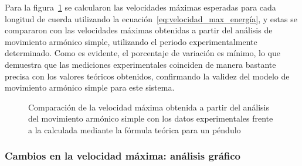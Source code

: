 \documentclass[letterpaper]{report}
\numberwithin{table}{section}
\begin{document}
Para la figura~\ref{fig:velocidad_máxima_mas_energía} se calcularon
las velocidades máximas esperadas para cada longitud de
cuerda utilizando la ecuación~\eqref{eq:velocidad_max_energía}, y
estas se compararon con las velocidades máximas obtenidas a partir
del análisis de movimiento armónico simple, utilizando el periodo
experimentalmente determinado. Como es evidente, el porcentaje de
variación es mínimo, lo que demuestra que las mediciones
experimentales coinciden de manera bastante precisa con los valores
teóricos obtenidos, confirmando la validez del modelo de movimiento
armónico simple para este sistema.

\begin{figure}[h]
  \centering
  \caption{Comparación de la velocidad máxima obtenida a partir del
    análisis del movimiento armónico simple con los datos
    experimentales frente a la calculada mediante la fórmula teórica
  para un péndulo}\label{fig:velocidad_máxima_mas_energía}
\end{figure}

\subsubsection{Cambios en la velocidad máxima: análisis gráfico}
\end{document}
